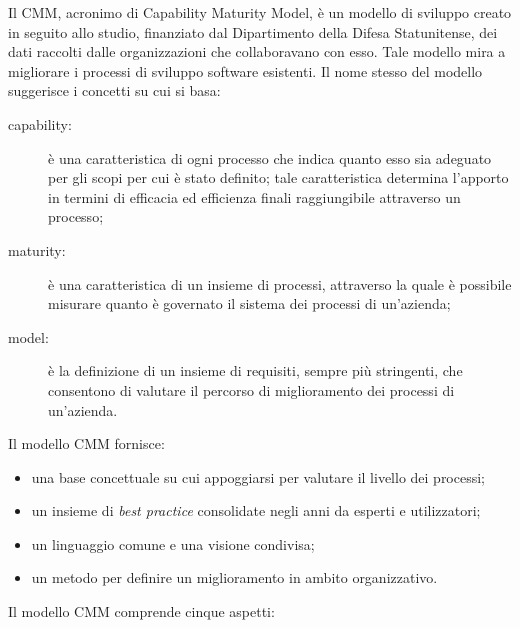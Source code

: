  \label{app:CMM}
	Il CMM, acronimo di Capability Maturity Model, è un modello di sviluppo creato in seguito allo studio, finanziato dal  Dipartimento della Difesa Statunitense, dei dati raccolti dalle organizzazioni che collaboravano con esso. Tale modello mira a migliorare i processi di sviluppo software esistenti.
	Il nome stesso del modello suggerisce i concetti su cui si basa:
	\begin{description}
		\item[capability:] è una caratteristica di ogni processo che indica quanto esso sia adeguato per gli scopi per cui è stato definito; tale caratteristica determina l'apporto in termini di efficacia ed efficienza finali raggiungibile attraverso un processo;
		\item[maturity:] è una caratteristica di un insieme di processi, attraverso la quale è possibile misurare quanto è governato il sistema dei processi di un'azienda;
		\item[model:] è la definizione di un insieme di requisiti, sempre più stringenti, che consentono di valutare il percorso di miglioramento dei processi di un'azienda.
	\end{description}
	Il modello CMM fornisce:
	\begin{itemize} 
		\item una base concettuale su cui appoggiarsi per valutare il livello dei processi;
		\item un insieme di \textit{best practice} consolidate negli anni da esperti e utilizzatori;
		\item un linguaggio comune e una visione condivisa;
		\item un metodo per definire un miglioramento in ambito organizzativo.
	\end{itemize}
		Il modello CMM comprende cinque aspetti:
